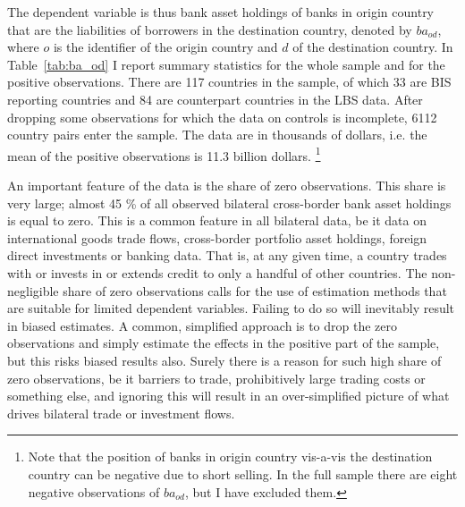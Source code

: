 \documentclass[12pt,a4paper]{article}
\begin{document}
The dependent variable is thus bank asset holdings of banks in origin country that are the liabilities of borrowers in the destination country, denoted by $ba_{od}$, where $o$ is the identifier of the origin country and $d$ of the destination country. In Table~\ref{tab:ba_od} I report summary statistics for the whole sample and for the positive observations. There are 117 countries in the sample, of which 33 are BIS reporting countries and 84 are counterpart countries in the LBS data. After dropping some observations for which the data on controls is incomplete, 6112 country pairs enter the sample. The data are in thousands of dollars, i.e. the mean of the positive observations is 11.3 billion dollars. \footnote{Note that the position of banks in origin country vis-a-vis the destination country can be negative due to short selling. In the full sample there are eight negative observations of $ba_{od}$, but I have excluded them.} 

An important feature of the data is the share of zero observations. This share is very large; almost 45 \% of all observed bilateral cross-border bank asset holdings is equal to zero. This is a common feature in all bilateral data, be it data on international goods trade flows, cross-border portfolio asset holdings, foreign direct investments or banking data. That is, at any given time, a country trades with or invests in or extends credit to only a handful of other countries. The non-negligible share of zero observations calls for the use of estimation methods that are suitable for limited dependent variables. Failing to do so will inevitably result in biased estimates. A common, simplified approach is to drop the zero observations and simply estimate the effects in the positive part of the sample, but this risks biased results also. Surely there is a reason for such high share of zero observations, be it barriers to trade, prohibitively large trading costs or something else, and ignoring this will result in an over-simplified picture of what drives bilateral trade or investment flows.
\end{document}
